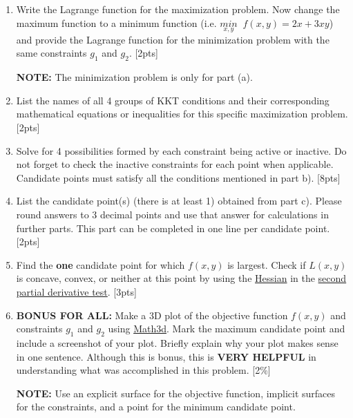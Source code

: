 \documentclass{article}
\begin{document}
\begin{enumerate}[label=(\alph*)]
    \item Write the Lagrange function for the maximization problem. Now change the maximum function to a minimum function (i.e. $\underset{x,y}{min} \;\; f(x,y) = 2x + 3xy$) and provide the Lagrange function for the minimization problem with the same constraints $g_1$ and $g_2$.  [2pts]
        \par\textbf{NOTE:} The minimization problem is only for part (a).
    \item List the names of all 4 groups of KKT conditions and their corresponding mathematical equations or inequalities for this specific maximization problem. [2pts]
    \item Solve for 4 possibilities formed by each constraint being active or inactive. Do not forget to check the inactive constraints for each point when applicable. Candidate points must satisfy all the conditions mentioned in part b).   [8pts]
    \item List the candidate point(s) (there is at least 1) obtained from part c). Please round answers to 3 decimal points and use that answer for calculations in further parts. This part can be completed in one line per candidate point. [2pts]
    \item Find the \textbf{one} candidate point for which $f(x,y)$ is largest. Check if $L(x,y)$ is concave, convex, or neither at this point by using the \href{https://www.khanacademy.org/math/multivariable-calculus/applications-of-multivariable-derivatives/quadratic-approximations/a/the-hessian}{Hessian} in the \href{https://www.khanacademy.org/math/multivariable-calculus/applications-of-multivariable-derivatives/optimizing-multivariable-functions/a/second-partial-derivative-test}{second partial derivative test}.  [3pts]
    \item \textbf{BONUS FOR ALL:} Make a 3D plot of the objective function $f(x,y)$ and constraints $g_1$ and $g_2$ using \href{https://www.math3d.org/}{Math3d}. Mark the maximum candidate point and include a screenshot of your plot. Briefly explain why your plot makes sense in one sentence. Although this is bonus, this is \textbf{VERY HELPFUL} in understanding what was accomplished in this problem. [2\%]
    \par\textbf{NOTE:} Use an explicit surface for the objective function, implicit surfaces for the constraints, and a point for the minimum candidate point. \\
\end{enumerate}
\end{document}
